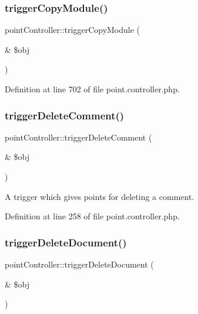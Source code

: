 \mbox{\label{classpointController_a5d9adb9225985cfaf8b968f1b1a95bc5}} 
\subsubsection{\texorpdfstring{trigger\+Copy\+Module()}{triggerCopyModule()}}
{\footnotesize\ttfamily point\+Controller\+::trigger\+Copy\+Module (\begin{DoxyParamCaption}\item[{\&}]{\$obj }\end{DoxyParamCaption})}



Definition at line 702 of file point.\+controller.\+php.

\mbox{\label{classpointController_ac6e1679b70da98f95a3a6cfe190a96f2}} 
\subsubsection{\texorpdfstring{trigger\+Delete\+Comment()}{triggerDeleteComment()}}
{\footnotesize\ttfamily point\+Controller\+::trigger\+Delete\+Comment (\begin{DoxyParamCaption}\item[{\&}]{\$obj }\end{DoxyParamCaption})}



A trigger which gives points for deleting a comment. 



Definition at line 258 of file point.\+controller.\+php.

\mbox{\label{classpointController_a12526b69a68224eccbb3816e8724e4a4}} 
\subsubsection{\texorpdfstring{trigger\+Delete\+Document()}{triggerDeleteDocument()}}
{\footnotesize\ttfamily point\+Controller\+::trigger\+Delete\+Document (\begin{DoxyParamCaption}\item[{\&}]{\$obj }\end{DoxyParamCaption})}



